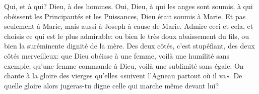 Qui, et à qui?
	Dieu, à des hommes.
Oui, Dieu, à qui les anges sont soumis,
	à qui obéissent les Principautés et les Puissances,
	Dieu était soumis à Marie.
	Et pas seulement à Marie, mais aussi à Joseph à cause de Marie.
Admire ceci et cela, et choisis ce qui est le plus admirable:
	ou bien le très doux abaissement du fils, ou bien la suréminente dignité de la mère.
Des deux côtés, c'est stupéfiant, des deux côtés merveilleux:
	que Dieu obéisse à une femme, voilà une humilité sans exemple;	 
	qu'une femme commande à Dieu, voilà une sublimité sans égale.
On chante à la gloire des vierges qu'elles «suivent l'Agneau partout où il va».
De quelle gloire alors jugeras-tu digne celle qui marche même devant lui?
